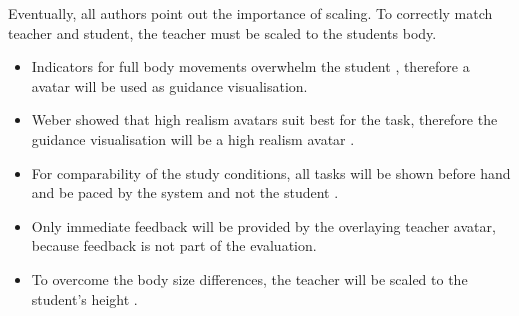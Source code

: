 Eventually, all authors point out the importance of scaling. To correctly match teacher and student, the teacher must be scaled to the students body.
\begin{tcolorbox}[colback=red!30!white]
	\begin{itemize}
		\item 	Indicators for full body movements overwhelm the student \cite{Sodhi2012}, therefore a avatar will be used as guidance visualisation.
		\item Weber showed that high realism avatars suit best for the task, therefore the guidance visualisation will be a high realism avatar \cite{Weber2018}.
		\item For comparability of the study conditions, all tasks will be shown before hand and be paced by the system and not the student \cite{Sodhi2012}.
		\item Only immediate feedback will be provided by the overlaying teacher avatar, because feedback is not part of the evaluation.
		\item To overcome the body size differences, the teacher will be scaled to the student's height \cite{Hoang2016, Chan2010, Tang2015}.
		\end{itemize}
\end{tcolorbox}

\newpage
